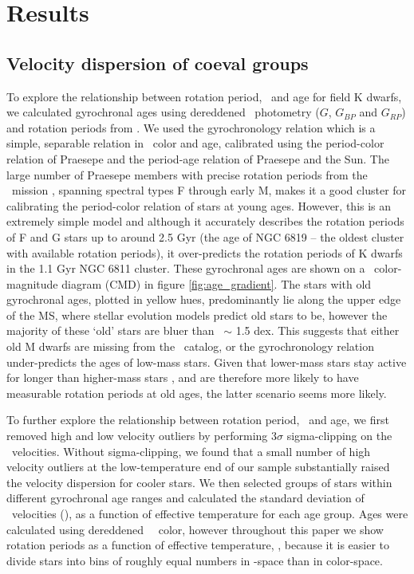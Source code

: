 \section{Results}
\label{sec:results}

\subsection{Velocity dispersion of coeval groups}
\label{sec:age_cut}

To explore the relationship between rotation period, \teff\ and age for field
K dwarfs, we calculated gyrochronal ages using dereddened \Gaia\ photometry
($G$, $G_{BP}$ and $G_{RP}$) and rotation periods from \citet{mcquillan2014}.
We used the \citet{angus2019} gyrochronology relation which is a simple,
separable relation in \gcolor\ color and age, calibrated using the
period-color relation of Praesepe and the period-age relation of Praesepe and
the Sun.
The large number of Praesepe members with precise rotation periods from the
\ktwo\ mission \citep{howell2014, douglas2017, rebull2017}, spanning spectral
types F through early M, makes it a good cluster for calibrating the
period-color relation of stars at young ages.
However, this is an extremely simple model and although it accurately
describes the rotation periods of F and G stars up to around 2.5 Gyr (the age
of NGC 6819 -- the oldest cluster with available rotation periods), it
over-predicts the rotation periods of K dwarfs in the 1.1 Gyr NGC 6811
cluster.
These gyrochronal ages are shown on a \gaia\ color-magnitude diagram (CMD) in
figure \ref{fig:age_gradient}.
The stars with old gyrochronal ages, plotted in yellow hues, predominantly lie
along the upper edge of the MS, where stellar evolution models predict old
stars to be, however the majority of these `old' stars are bluer than \gcolor\
$\sim$ 1.5 dex.
This suggests that either old M dwarfs are missing from the \mct\ catalog, or
the \citet{angus2019} gyrochronology relation under-predicts the ages of
low-mass stars.
Given that lower-mass stars stay active for longer than higher-mass stars
\citep[\eg][]{west2011}, and are therefore more likely to have measurable
rotation periods at old ages, the latter scenario seems more likely.

To further explore the relationship between rotation period, \teff\ and age,
we first removed high and low velocity outliers by performing 3$\sigma$
sigma-clipping on the \vb\ velocities.
Without sigma-clipping, we found that a small number of high velocity
outliers at the low-temperature end of our sample substantially raised the
velocity dispersion for cooler stars.
We then selected groups of stars within different gyrochronal age ranges and
calculated the standard deviation of \vb\ velocities (\sigmavb), as a function
of effective temperature for each age group.
Ages were calculated using dereddened \gaia\ \gcolor\ color, however
throughout this paper we show rotation periods as a function of effective
temperature, \teff, because it is easier to divide stars into bins of roughly
equal numbers in \teff-space than in color-space.

